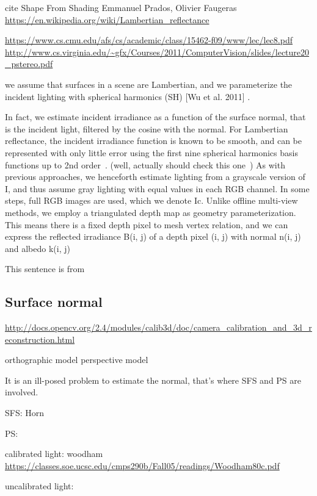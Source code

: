 cite Shape From Shading Emmanuel Prados, Olivier Faugeras
\url{https://en.wikipedia.org/wiki/Lambertian_reflectance}

\url{https://www.cs.cmu.edu/afs/cs/academic/class/15462-f09/www/lec/lec8.pdf}
\url{http://www.cs.virginia.edu/~gfx/Courses/2011/ComputerVision/slides/lecture20_pstereo.pdf}


we assume that surfaces in a scene are Lambertian, and we parameterize the incident lighting with spherical harmonics (SH) [Wu et al. 2011] \cite{wu2011shading}.

In fact, we estimate incident irradiance as a function of the surface normal, that is the incident light, filtered by the cosine with the normal. For Lambertian reflectance, the incident irradiance function is known to be smooth, and can be represented with only little error using the first nine spherical harmonics basis functions up to 2nd order~\cite{ramamoorthi2001efficient}. (well, actually should check this one~\cite{ramamoorthi2001relationship})
As with previous approaches, we henceforth estimate lighting from a grayscale version of I, and thus assume gray lighting with equal values in each RGB channel. In some steps, full RGB images are used, which we denote Ic. Unlike offline multi-view methods, we employ a triangulated depth map as geometry parameterization. This means there is a fixed depth pixel to mesh vertex relation, and we can express the reflected irradiance B(i, j) of a depth pixel (i, j) with normal n(i, j) and albedo k(i, j)

This sentence is from\cite{wu2014real}


\subsection{Surface normal}
\url{http://docs.opencv.org/2.4/modules/calib3d/doc/camera_calibration_and_3d_reconstruction.html}

orthographic model
perspective model

It is an ill-posed problem to estimate the normal, that's where SFS and PS are involved. 

SFS:
Horn

PS:

calibrated light: woodham~\cite{woodham1980photometric} \url{https://classes.soe.ucsc.edu/cmps290b/Fall05/readings/Woodham80c.pdf}

uncalibrated light:

